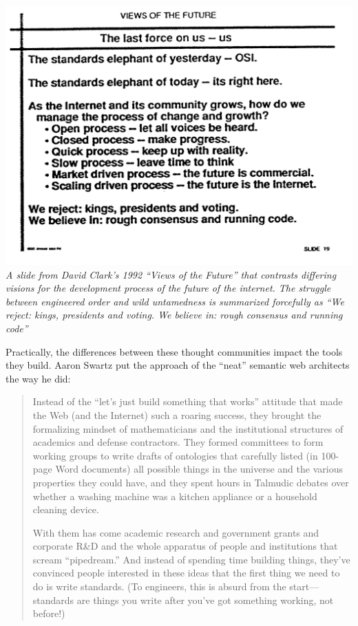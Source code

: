 \documentclass[10pt]{article}
\begin{document}
\begin{multicols}{2}
\includegraphics[width=\linewidth]{../assets/images/clark-slide.png} \emph{A
slide from David Clark's 1992 ``Views of the Future''\cite{clarkCloudyCrystalBall1992}  that contrasts differing visions for the
development process of the future of the internet. The struggle between
engineered order and wild untamedness is summarized forcefully as ``We
reject: kings, presidents and voting. We believe in: rough consensus and
running code''}

Practically, the differences between these thought communities impact
the tools they build. Aaron Swartz put the approach of the ``neat''
semantic web architects the way he did:

\begin{quote}
Instead of the ``let's just build something that works'' attitude that
made the Web (and the Internet) such a roaring success, they brought the
formalizing mindset of mathematicians and the institutional structures
of academics and defense contractors. They formed committees to form
working groups to write drafts of ontologies that carefully listed (in
100-page Word documents) all possible things in the universe and the
various properties they could have, and they spent hours in Talmudic
debates over whether a washing machine was a kitchen appliance or a
household cleaning device.

With them has come academic research and government grants and corporate
R\&D and the whole apparatus of people and institutions that scream
``pipedream.'' And instead of spending time building things, they've
convinced people interested in these ideas that the first thing we need
to do is write standards. (To engineers, this is absurd from the
start---standards are things you write after you've got something
working, not before!) \cite{swartzAaronSwartzProgrammable2013} 
\end{quote}


\end{multicols}
\end{document}
